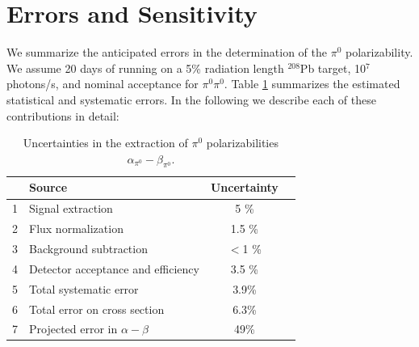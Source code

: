 \section{Errors and Sensitivity}
We summarize the anticipated errors in the determination of the $\pi^0$ polarizability. We assume 
20 days of running on a 5\% radiation length $^{208}$Pb target, 10$^7$ photons/s, and nominal acceptance for $\pi^0 \pi^0$.
Table \ref{errors} summarizes the estimated statistical and systematic errors. In the following we describe each of
these contributions in detail: 

\begin{table}[bt]
\caption{Uncertainties in the extraction of $\pi^0$ polarizabilities $\alpha_{\pi^0}-\beta_{\pi^0}$.
\label{errors}
}
\begin{center}
\begin{tabular}{|l|l|c|c|}
\hline
\hline
  &  Source  & Uncertainty   \\  \hline \hline
  1 & Signal extraction  &  5 \%    \\ \hline
  2 & Flux normalization &  1.5 \%     \\ \hline
  3 & Background subtraction  & $<$1 \%  \\ \hline
  4 & Detector acceptance and efficiency &  3.5 \%   \\ \hline
  5 & Total systematic error  &  3.9\% \\ \hline
  6 & Total error on cross section  &  6.3\% \\ \hline
  7 & Projected error in $\alpha - \beta$ &  49\%  \\ 
 \hline
 \hline
\end{tabular}
\end{center}
\end{table}

